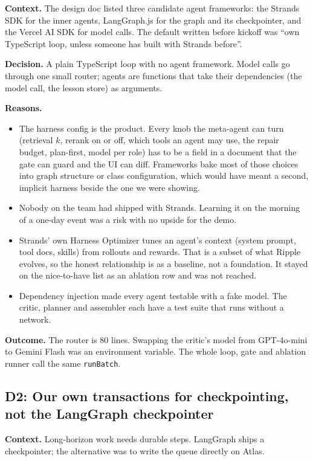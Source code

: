 \documentclass[11pt,a4paper]{article}
\newcommand{\code}[1]{\texttt{#1}}
\begin{document}
\textbf{Context.} The design doc listed three candidate agent frameworks: the Strands SDK for the inner agents, LangGraph.js for the graph and its checkpointer, and the Vercel AI SDK for model calls. The default written before kickoff was ``own TypeScript loop, unless someone has built with Strands before''.

\textbf{Decision.} A plain TypeScript loop with no agent framework. Model calls go through one small router; agents are functions that take their dependencies (the model call, the lesson store) as arguments.

\textbf{Reasons.}
\begin{itemize}
  \item The harness config is the product. Every knob the meta-agent can turn (retrieval $k$, rerank on or off, which tools an agent may use, the repair budget, plan-first, model per role) has to be a field in a document that the gate can guard and the UI can diff. Frameworks bake most of those choices into graph structure or class configuration, which would have meant a second, implicit harness beside the one we were showing.
  \item Nobody on the team had shipped with Strands. Learning it on the morning of a one-day event was a risk with no upside for the demo.
  \item Strands' own Harness Optimizer tunes an agent's context (system prompt, tool docs, skills) from rollouts and rewards. That is a subset of what Ripple evolves, so the honest relationship is as a baseline, not a foundation. It stayed on the nice-to-have list as an ablation row and was not reached.
  \item Dependency injection made every agent testable with a fake model. The critic, planner and assembler each have a test suite that runs without a network.
\end{itemize}

\textbf{Outcome.} The router is 80 lines. Swapping the critic's model from GPT-4o-mini to Gemini Flash was an environment variable. The whole loop, gate and ablation runner call the same \code{runBatch}.

\subsection{D2: Our own transactions for checkpointing, not the LangGraph checkpointer}

\textbf{Context.} Long-horizon work needs durable steps. LangGraph ships a checkpointer; the alternative was to write the queue directly on Atlas.
\end{document}
